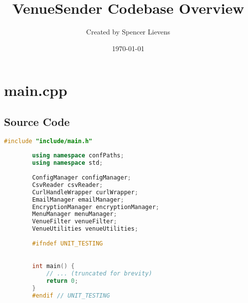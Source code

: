 \documentclass{article}
\title{VenueSender Codebase Overview}
\author{Created by Spencer Lievens}
\date{\today}
\begin{document}
	
	\maketitle
	\tableofcontents
	\newpage
	
	\section{main.cpp}
	
	\subsection*{Source Code}
	\begin{mdframed}[backgroundcolor=background, hidealllines=false, innerleftmargin=15pt, innerrightmargin=5pt, innertopmargin=0pt, innerbottommargin=-5pt]
	\begin{lstlisting}[language=C++]
		#include "include/main.h"
		
		using namespace confPaths;
		using namespace std;
		
		ConfigManager configManager;
		CsvReader csvReader;
		CurlHandleWrapper curlWrapper;
		EmailManager emailManager;
		EncryptionManager encryptionManager;
		MenuManager menuManager;
		VenueFilter venueFilter;
		VenueUtilities venueUtilities;
		
		#ifndef UNIT_TESTING

		
		int main() {
			// ... (truncated for brevity)
			return 0;
		}
		#endif // UNIT_TESTING
	\end{lstlisting}
\end{mdframed}
	
\end{document}
